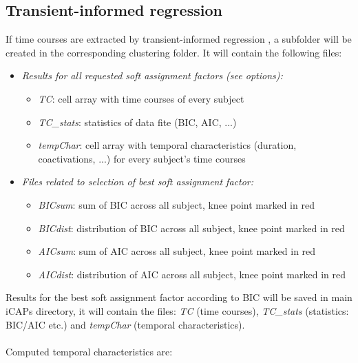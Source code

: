 \documentclass{article}
\begin{document}
\subsection{Transient-informed regression}
If time courses are extracted by transient-informed regression \cite{Zoller2018}, a subfolder will be created in the corresponding clustering folder. It will contain the following files:
\begin{itemize}
\item {\textit{Results for all requested soft assignment factors (see options):}
	\begin{itemize}
	\item \textit{TC}: cell array with time courses of every subject
	\item \textit{TC\_stats}: statistics of data fite (BIC, AIC, ...)
	\item \textit{tempChar}: cell array with temporal characteristics (duration, coactivations, ...) for every subject's time courses
	\end{itemize}}
\item {\textit{Files related to selection of best soft assignment factor:}
	\begin{itemize}
	\item \textit{BICsum}: sum of BIC across all subject, knee point marked in red
	\item \textit{BICdist}: distribution of BIC across all subject, knee point marked in red
	\item \textit{AICsum}: sum of AIC across all subject, knee point marked in red
	\item \textit{AICdist}: distribution of AIC across all subject, knee point marked in red
	\end{itemize}}
\end{itemize}
Results for the best soft assignment factor according to BIC will be saved in main iCAPs directory, it will contain the files: \textit{TC} (time courses), \textit{TC\_stats} (statistics: BIC/AIC etc.) and \textit{tempChar} (temporal characteristics).
\\\\
Computed temporal characteristics are:
\end{document}
